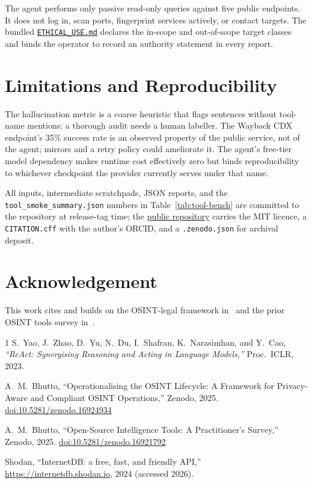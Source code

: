 \documentclass[conference]{IEEEtran}
\begin{document}
The agent performs only passive read-only queries against five public
endpoints. It does not log in, scan ports, fingerprint services
actively, or contact targets. The bundled
\href{https://github.com/thunderstornX/agentic-osint-agent/blob/main/ETHICAL_USE.md}{\texttt{ETHICAL\_USE.md}}
declares the in-scope and out-of-scope target classes and binds the
operator to record an authority statement in every report.

\section{Limitations and Reproducibility}
\label{sec:limits}

The hallucination metric is a coarse heuristic that flags sentences
without tool-name mentions; a thorough audit needs a human labeller.
The Wayback CDX endpoint's 35\% success rate is an observed property
of the public service, not of the agent; mirrors and a retry policy
could ameliorate it. The agent's free-tier model dependency makes
runtime cost effectively zero but binds reproducibility to whichever
checkpoint the provider currently serves under that name.

All inputs, intermediate scratchpads, JSON reports, and the
\texttt{tool\_smoke\_summary.json} numbers in
Table~\ref{tab:tool-bench} are committed to the repository at
release-tag time; the
\href{https://github.com/thunderstornX/agentic-osint-agent}{public
repository} carries the MIT licence, a \texttt{CITATION.cff} with the
author's ORCID, and a \texttt{.zenodo.json} for archival deposit.

\section*{Acknowledgement}

This work cites and builds on the OSINT-legal framework
in~\cite{bhutto2025osintlegal} and the prior OSINT tools survey
in~\cite{bhutto2025osinttools}.

\begin{thebibliography}{1}
S.~Yao, J.~Zhao, D.~Yu, N.~Du, I.~Shafran, K.~Narasimhan, and Y.~Cao,
\emph{``ReAct: Synergising Reasoning and Acting in Language Models,''}
Proc.\ ICLR, 2023.

A.~M.~Bhutto, ``Operationalising the OSINT Lifecycle: A Framework for
Privacy-Aware and Compliant OSINT Operations,'' Zenodo, 2025.
\href{https://doi.org/10.5281/zenodo.16924934}{doi:10.5281/zenodo.16924934}

A.~M.~Bhutto, ``Open-Source Intelligence Tools: A Practitioner's
Survey,'' Zenodo, 2025.
\href{https://doi.org/10.5281/zenodo.16921792}{doi:10.5281/zenodo.16921792}

Shodan, ``InternetDB: a free, fast, and friendly API,''
\url{https://internetdb.shodan.io}, 2024 (accessed 2026).
\end{thebibliography}
\end{document}
